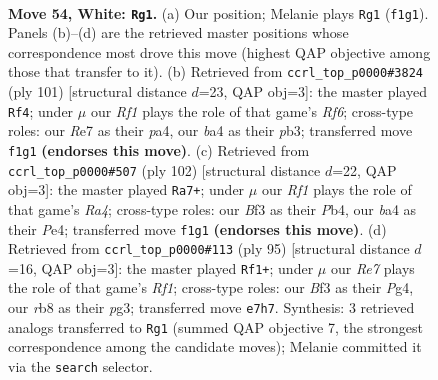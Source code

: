 \documentclass[11pt]{article}
\begin{document}
\clearpage

\begin{figure}[p]\centering
\begin{subfigure}{0.46\textwidth}\centering
\resizebox{\linewidth}{!}{%
\newchessgame
\chessboard[
  setfen={1r6/4R3/pp5k/8/bP6/P4B1K/3r4/5R2 w - - 10 54},
  showmover=false,
  pgfstyle=straightmove, color=movearrow, markmove={f1-g1}
]}
\caption{}
\end{subfigure}\hfill
\begin{subfigure}{0.46\textwidth}\centering
\resizebox{\linewidth}{!}{%
\newchessgame
\chessboard[
  setfen={8/1R6/4k1p1/7p/P6P/1P1p1r2/8/4K3 b - - 0 51},
  showmover=false,
  pgfstyle=straightmove, color=movearrow, markmove={f3-f4}
]}
\caption{}
\end{subfigure}
\\[4pt]
\begin{subfigure}{0.46\textwidth}\centering
\resizebox{\linewidth}{!}{%
\newchessgame
\chessboard[
  setfen={8/4k1p1/8/4p2p/RP2P2P/6r1/4K3/8 w - - 0 52},
  showmover=false,
  pgfstyle=straightmove, color=movearrow, markmove={a4-a7}
]}
\caption{}
\end{subfigure}\hfill
\begin{subfigure}{0.46\textwidth}\centering
\resizebox{\linewidth}{!}{%
\newchessgame
\chessboard[
  setfen={5r2/8/7k/1p1BR3/1P1p2p1/3P2Pb/8/6K1 b - - 0 48},
  showmover=false,
  pgfstyle=straightmove, color=movearrow, markmove={f8-f1}
]}
\caption{}
\end{subfigure}
\caption{\textbf{Move 54, White: \texttt{Rg1}.} (a) Our position; Melanie plays \texttt{Rg1} (\texttt{f1g1}). Panels (b)--(d) are the retrieved master positions whose correspondence most drove this move (highest QAP objective among those that transfer to it). (b) Retrieved from \texttt{ccrl\_top\_p0000\#3824} (ply 101) [structural distance $d$=23, QAP obj=3]: the master played \texttt{Rf4}; under $\mu$ our \emph{Rf1} plays the role of that game's \emph{Rf6}; cross-type roles: our \emph{R}e7 as their \emph{p}a4, our \emph{b}a4 as their \emph{p}b3; transferred move \texttt{f1g1} \textbf{(endorses this move)}. (c) Retrieved from \texttt{ccrl\_top\_p0000\#507} (ply 102) [structural distance $d$=22, QAP obj=3]: the master played \texttt{Ra7+}; under $\mu$ our \emph{Rf1} plays the role of that game's \emph{Ra4}; cross-type roles: our \emph{B}f3 as their \emph{P}b4, our \emph{b}a4 as their \emph{P}e4; transferred move \texttt{f1g1} \textbf{(endorses this move)}. (d) Retrieved from \texttt{ccrl\_top\_p0000\#113} (ply 95) [structural distance $d$=16, QAP obj=3]: the master played \texttt{Rf1+}; under $\mu$ our \emph{Re7} plays the role of that game's \emph{Rf1}; cross-type roles: our \emph{B}f3 as their \emph{P}g4, our \emph{r}b8 as their \emph{p}g3; transferred move \texttt{e7h7}. Synthesis: 3 retrieved analogs transferred to \texttt{Rg1} (summed QAP objective 7, the strongest correspondence among the candidate moves); Melanie committed it via the \texttt{search} selector.}
\label{fig:thought-m106}
\end{figure}
\end{document}

